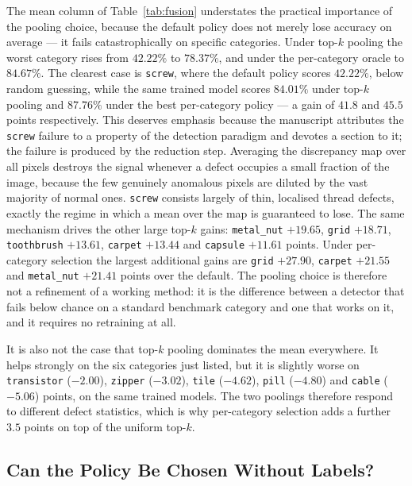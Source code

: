 The mean column of Table~\ref{tab:fusion} understates the practical importance of
the pooling choice, because the default policy does not merely lose accuracy on
average --- it fails catastrophically on specific categories. Under top-$k$
pooling the worst category rises from $42.22\%$ to $78.37\%$, and under the
per-category oracle to $84.67\%$. The clearest case is \texttt{screw}, where the
default policy scores $42.22\%$, below random guessing, while the same trained
model scores $84.01\%$ under top-$k$ pooling and $87.76\%$ under the best
per-category policy --- a gain of $41.8$ and $45.5$ points respectively. This
deserves emphasis because the manuscript attributes the \texttt{screw} failure to
a property of the detection paradigm and devotes a section to it; the failure is
produced by the reduction step. Averaging the discrepancy map over all pixels
destroys the signal whenever a defect occupies a small fraction of the image,
because the few genuinely anomalous pixels are diluted by the vast majority of
normal ones. \texttt{screw} consists largely of thin, localised thread defects,
exactly the regime in which a mean over the map is guaranteed to lose. The same
mechanism drives the other large top-$k$ gains: \texttt{metal\_nut} $+19.65$,
\texttt{grid} $+18.71$, \texttt{toothbrush} $+13.61$, \texttt{carpet} $+13.44$ and
\texttt{capsule} $+11.61$ points. Under per-category selection the largest
additional gains are \texttt{grid} $+27.90$, \texttt{carpet} $+21.55$ and
\texttt{metal\_nut} $+21.41$ points over the default. The pooling choice is
therefore not a refinement of a working method: it is the difference between a
detector that fails below chance on a standard benchmark category and one that
works on it, and it requires no retraining at all.

It is also not the case that top-$k$ pooling dominates the mean everywhere. It
helps strongly on the six categories just listed, but it is slightly worse on
\texttt{transistor} ($-2.00$), \texttt{zipper} ($-3.02$), \texttt{tile}
($-4.62$), \texttt{pill} ($-4.80$) and \texttt{cable} ($-5.06$) points, on the
same trained models. The two poolings therefore respond to different defect
statistics, which is why per-category selection adds a further $3.5$ points on
top of the uniform top-$k$.

\subsection{Can the Policy Be Chosen Without Labels?}
\label{subsec:label_free}


